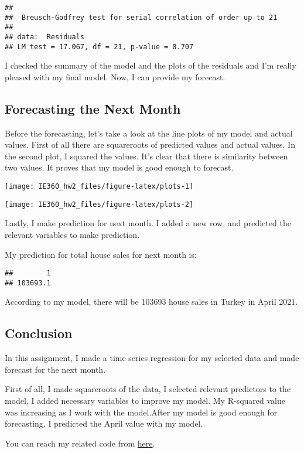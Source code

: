 \documentclass[
]{article}
\begin{document}
\begin{verbatim}
## 
##  Breusch-Godfrey test for serial correlation of order up to 21
## 
## data:  Residuals
## LM test = 17.067, df = 21, p-value = 0.707
\end{verbatim}

I checked the summary of the model and the plots of the residuals and
I'm really pleased with my final model. Now, I can provide my forecast.

\hypertarget{forecasting-the-next-month}{%
\subsection{Forecasting the Next
Month}\label{forecasting-the-next-month}}

Before the forecasting, let's take a look at the line plots of my model
and actual values. First of all there are squareroots of predicted
values and actual values. In the second plot, I squared the values. It's
clear that there is similarity between two values. It proves that my
model is good enough to forecast.

\begin{center}\texttt{[image: IE360\_hw2\_files/figure-latex/plots-1]} \end{center}

\begin{center}\texttt{[image: IE360\_hw2\_files/figure-latex/plots-2]} \end{center}

Lastly, I make prediction for next month. I added a new row, and
predicted the relevant variables to make prediction.

My prediction for total house sales for next month is:

\begin{verbatim}
##        1 
## 103693.1
\end{verbatim}

According to my model, there will be 103693 house sales in Turkey in
April 2021.

\hypertarget{conclusion}{%
\subsection{Conclusion}\label{conclusion}}

In this assignment, I made a time series regression for my selected data
and made forecast for the next month.

First of all, I made squareroots of the data, I selected relevant
predictors to the model, I added necessary variables to improve my
model. My R-squared value was increasing as I work with the model.After
my model is good enough for forecasting, I predicted the April value
with my model.

You can reach my related code from
\href{https://bu-ie-360.github.io/spring21-OzlemSenel/Files/IE_360hw2.Rmd}{here}.
\end{document}
